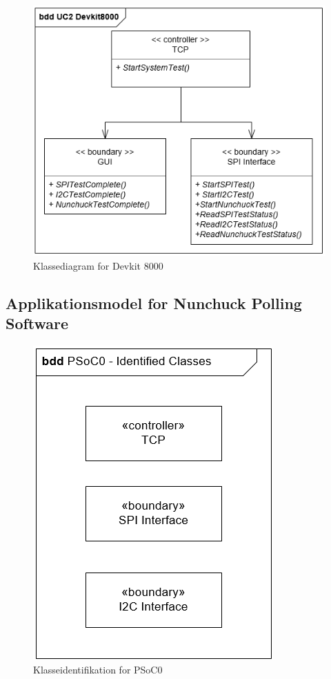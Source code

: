 \begin{figure}[H]
	\centering
	\includegraphics[] {Systemarkitektur/images/DevKit8000ClassDiagram}
	\caption{Klassediagram for Devkit 8000}
	\label{fig:klasseDevkit}
\end{figure}

\subsection{Applikationsmodel for Nunchuck Polling Software}

\begin{figure}[H]
	\centering
	\includegraphics[scale=0.8]{Systemarkitektur/images/KlasseIdentifikationPSoC0.png}
	\caption{Klasseidentifikation for PSoC0}
	\label{fig:klasseidentifikationPSoC}
\end{figure}

